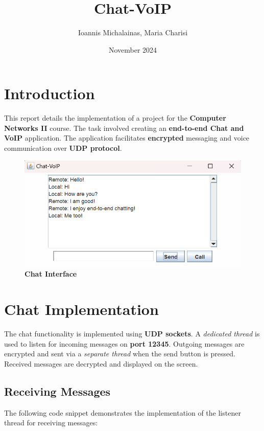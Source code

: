\documentclass[a4paper,12pt]{article}
\title{Chat-VoIP}
\author{Ioannis Michalainas, Maria Charisi}
\date{November 2024}
\begin{document}
\maketitle

\pagestyle{fancy}
\fancyhf{}
\fancyfoot[C]{\thepage}

\section{Introduction}
This report details the implementation of a project for the \textbf{Computer Networks II} course. The task involved creating an \textbf{end-to-end Chat and VoIP} application. The application facilitates \textbf{encrypted} messaging and voice communication over \textbf{UDP protocol}.

\begin{figure}[H]
    \centering
    \includegraphics[width=1\linewidth]{assets/Chat.png}
    \caption{\textbf{Chat Interface}}
    \label{fig:chat-interface}
\end{figure}

\section{Chat Implementation}

The chat functionality is implemented using \textbf{UDP sockets}. A \textit{dedicated thread} is used to listen for incoming messages on \textbf{port 12345}. Outgoing messages are encrypted and sent via a \textit{separate thread} when the send button is pressed. Received messages are decrypted and displayed on the screen.

\subsection{Receiving Messages}
The following code snippet demonstrates the implementation of the listener thread for receiving messages:
\end{document}
